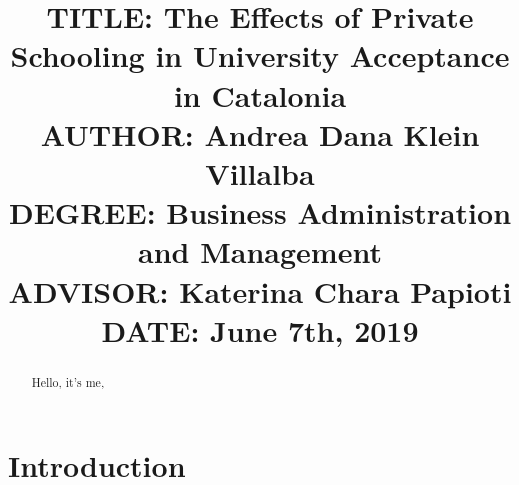 \documentclass[12pt]{article}
\begin{document}

\title{{\large TITLE: The Effects of Private Schooling in University Acceptance in Catalonia\\
AUTHOR: Andrea Dana Klein Villalba\\
DEGREE: Business Administration and Management\\
ADVISOR: Katerina Chara Papioti\\
DATE: June 7th, 2019\\}}
\date{}

\clearpage\maketitle
\thispagestyle{empty}
\newpage

\begin{abstract}
Hello, it's me,
\end{abstract}
\newpage

 \tableofcontents
 \newpage

\section{Introduction}
\end{document}
